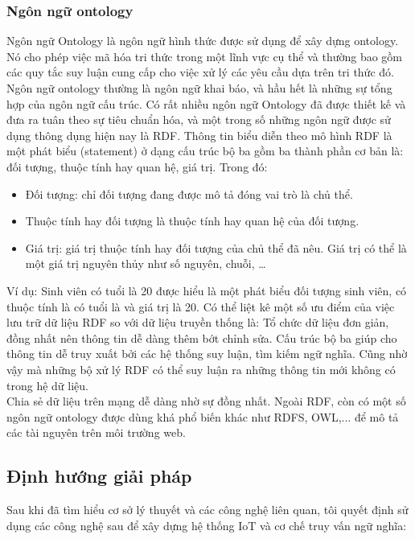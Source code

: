 \subsubsection{Ngôn ngữ ontology}
Ngôn ngữ Ontology là ngôn ngữ hình thức được sử dụng để xây dựng ontology. Nó cho phép việc mã hóa tri thức trong một lĩnh vực cụ thể và thường bao gồm các quy tắc suy luận cung cấp cho việc xử lý các yêu cầu dựa trên tri thức đó. Ngôn ngữ ontology thường là ngôn ngữ khai báo, và hầu hết là những sự tổng hợp của ngôn ngữ cấu trúc. Có rất nhiều ngôn ngữ Ontology đã được thiết kế và đưa ra tuân theo sự tiêu chuẩn hóa, và một trong số những ngôn ngữ được sử dụng thông dụng hiện nay là RDF. Thông tin biểu diễn theo mô hình RDF là một phát biểu (statement) ở dạng cấu trúc bộ ba gồm ba thành phần cơ bản là: đối tượng, thuộc tính hay quan hệ, giá trị. Trong đó:
\begin{itemize}
	\item Đối tượng: chỉ đối tượng đang được mô tả đóng vai trò là chủ thể.
	\item Thuộc tính hay đối tượng là thuộc tính hay quan hệ của đối tượng.
	\item Giá trị: giá trị thuộc tính hay đối tượng của chủ thể đã nêu. Giá trị có thể là một giá trị nguyên thủy như số nguyên, chuỗi, …
\end{itemize}
Ví dụ: Sinh viên có tuổi là 20 được hiểu là một phát biểu đối tượng sinh viên, có thuộc tính là có tuổi là và giá trị là 20.
Có thể liệt kê một số ưu điểm của việc lưu trữ dữ liệu RDF so với dữ liệu truyền thống là: 
Tổ chức dữ liệu đơn giản, đồng nhất nên thông tin dễ dàng thêm bớt chỉnh sửa.
Cấu trúc bộ ba giúp cho thông tin dễ truy xuất bởi các hệ thống suy luận, tìm kiếm ngữ nghĩa. Cũng nhờ vậy mà những bộ xử lý RDF có thể suy luận ra những thông tin mới không có trong hệ dữ liệu. \\
Chia sẻ dữ liệu trên mạng dễ dàng nhờ sự đồng nhất. Ngoài RDF, còn có một số ngôn ngữ ontology được dùng khá phổ biến khác như RDFS, OWL,... để mô tả các tài nguyên trên môi trường web.


\subsection{Định hướng giải pháp}
Sau khi đã tìm hiểu cơ sở lý thuyết và các công nghệ liên quan, tôi quyết định sử dụng các công nghệ sau để xây dựng hệ thống IoT và cơ chế truy vấn ngữ nghĩa: 

